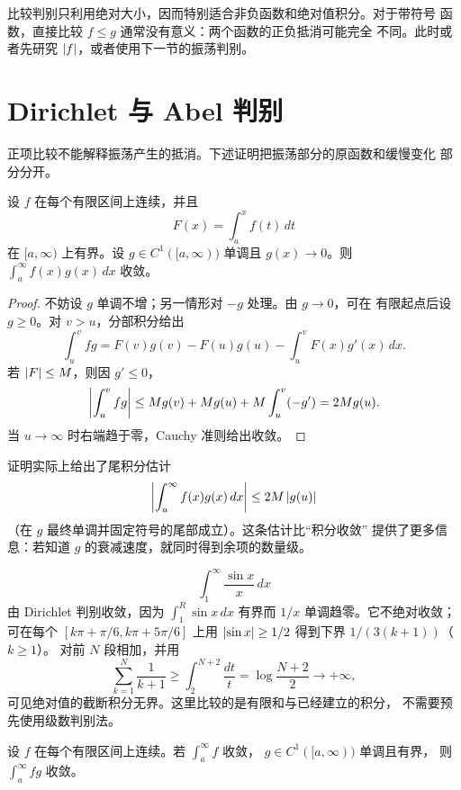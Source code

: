 比较判别只利用绝对大小，因而特别适合非负函数和绝对值积分。对于带符号
函数，直接比较 \(f\le g\) 通常没有意义：两个函数的正负抵消可能完全
不同。此时或者先研究 \(\left|f\right|\)，或者使用下一节的振荡判别。

\section{Dirichlet 与 Abel 判别}

正项比较不能解释振荡产生的抵消。下述证明把振荡部分的原函数和缓慢变化
部分分开。

\begin{theorem}
\label{thm:improper-dirichlet}
设 \(f\) 在每个有限区间上连续，并且
\[
 F(x)=\int_a^x f(t)\,dt
\]
在 \([a,\infty)\) 上有界。设 \(g\in C^1([a,\infty))\) 单调且
\(g(x)\to0\)。则 \(\int_a^\infty f(x)g(x)\,dx\) 收敛。
\end{theorem}

\begin{proof}
不妨设 \(g\) 单调不增；另一情形对 \(-g\) 处理。由 \(g\to0\)，可在
有限起点后设 \(g\ge0\)。对 \(v>u\)，分部积分给出
\[
 \int_u^v fg
 =F(v)g(v)-F(u)g(u)-\int_u^v F(x)g'(x)\,dx.
\]
若 \(\left|F\right|\le M\)，则因 \(g'\le0\)，
\[
 \left|\int_u^v fg\right|
 \le M g(v)+M g(u)+M\int_u^v(-g')
 =2M g(u).
\]
当 \(u\to\infty\) 时右端趋于零，Cauchy 准则给出收敛。
\end{proof}

证明实际上给出了尾积分估计
\[
 \left|\int_u^\infty f(x)g(x)\,dx\right|\le 2M\left|g(u)\right|
\]
（在 \(g\) 最终单调并固定符号的尾部成立）。这条估计比“积分收敛”
提供了更多信息：若知道 \(g\) 的衰减速度，就同时得到余项的数量级。

\begin{example}
\[
 \int_1^\infty\frac{\sin x}{x}\,dx
\]
由 Dirichlet 判别收敛，因为 \(\int_1^R\sin x\,dx\) 有界而 \(1/x\)
单调趋零。它不绝对收敛；可在每个
\([k\pi+\pi/6,k\pi+5\pi/6]\) 上用
\(\left|\sin x\right|\ge1/2\) 得到下界 \(1/(3(k+1))\)（\(k\ge1\)）。
对前 \(N\) 段相加，并用
\[
 \sum_{k=1}^N\frac1{k+1}\ge\int_2^{N+2}\frac{dt}{t}
 =\log\frac{N+2}{2}\longrightarrow+\infty,
\]
可见绝对值的截断积分无界。这里比较的是有限和与已经建立的积分，
不需要预先使用级数判别法。
\end{example}

\begin{theorem}
\label{thm:improper-abel}
设 \(f\) 在每个有限区间上连续。若 \(\int_a^\infty f\) 收敛，
\(g\in C^1([a,\infty))\) 单调且有界，
则 \(\int_a^\infty fg\) 收敛。
\end{theorem}

